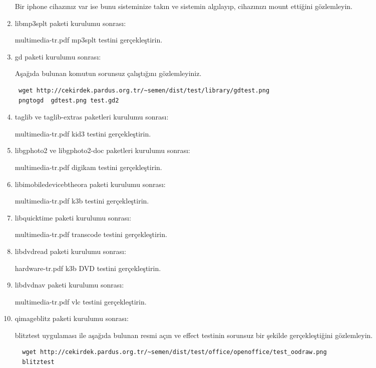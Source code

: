 \documentclass[a4paper,10pt]{article}
\begin{document}
\begin{enumerate}
Bir iphone cihazınız var ise bunu sisteminize takın ve sistemin algılayıp, cihazınızı mount ettiğini gözlemleyin.

\item libmp3splt paketi kurulumu sonrası:

multimedia-tr.pdf mp3splt testini gerçekleştirin.

\item gd paketi kurulumu sonrası:

Aşağıda bulunan komutun sorunsuz çalıştığını gözlemleyiniz.

\begin{verbatim}
 wget http://cekirdek.pardus.org.tr/~semen/dist/test/library/gdtest.png
 pngtogd  gdtest.png test.gd2
\end{verbatim}

\item taglib ve taglib-extras paketleri kurulumu sonrası:

multimedia-tr.pdf kid3 testini gerçekleştirin.

\item libgphoto2 ve libgphoto2-doc paketleri kurulumu sonrası:

multimedia-tr.pdf digikam testini gerçekleştirin.

\item libimobiledevicebtheora paketi kurulumu sonrası:

multimedia-tr.pdf k3b testini gerçekleştirin.

\item libquicktime paketi kurulumu sonrası:

multimedia-tr.pdf transcode testini gerçekleştirin.

\item libdvdread paketi kurulumu sonrası:

hardware-tr.pdf k3b DVD testini gerçekleştirin.

\item libdvdnav paketi kurulumu sonrası:

multimedia-tr.pdf vlc testini gerçekleştirin.

\item qimageblitz paketi kurulumu sonrası:

blitztest uygulaması ile aşağıda bulunan resmi açın ve effect testinin sorunsuz bir şekilde gerçekleştiğini gözlemleyin.
\begin{verbatim}
  wget http://cekirdek.pardus.org.tr/~semen/dist/test/office/openoffice/test_oodraw.png
  blitztest
\end{verbatim}



\end{enumerate}
\end{document}
